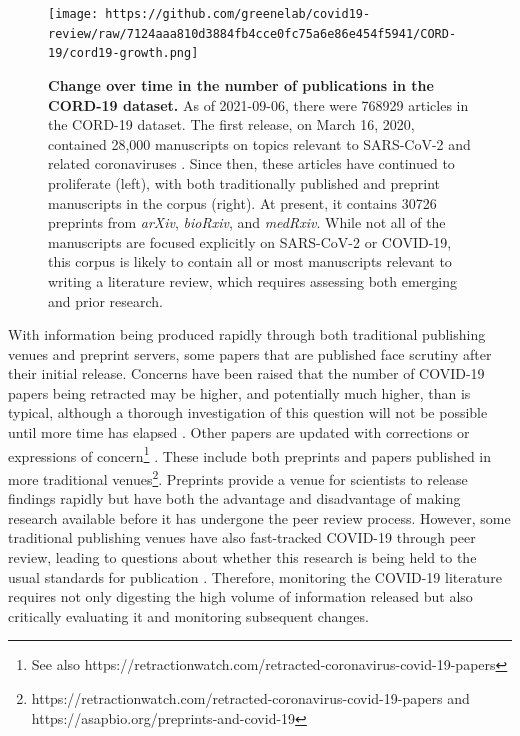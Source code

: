 \documentclass[twocolumn]{ceurart}
\begin{document}
\begin{figure}
\hypertarget{fig:cord19-growth}{%
\centering
\texttt{[image: https://github.com/greenelab/covid19-review/raw/7124aaa810d3884fb4cce0fc75a6e86e454f5941/CORD-19/cord19-growth.png]}
\caption{\textbf{Change over time in the number of publications in the CORD-19 dataset.}
As of 2021-09-06, there were 768929 articles in the CORD-19 dataset.
The first release, on March 16, 2020, contained 28,000 manuscripts on topics relevant to SARS-CoV-2 and related coronaviruses \citep{CiOwklc6}.
Since then, these articles have continued to proliferate (left), with both traditionally published and preprint manuscripts in the corpus (right).
At present, it contains 30726 preprints from \emph{arXiv}, \emph{bioRxiv}, and \emph{medRxiv}.
While not all of the manuscripts are focused explicitly on SARS-CoV-2 or COVID-19, this corpus is likely to contain all or most manuscripts relevant to writing a literature review, which requires assessing both emerging and prior research.}\label{fig:cord19-growth}
}
\end{figure}

With information being produced rapidly through both traditional publishing venues and preprint servers, some papers that are published face scrutiny after their initial release.
Concerns have been raised that the number of COVID-19 papers being retracted may be higher, and potentially much higher, than is typical, although a thorough investigation of this question will not be possible until more time has elapsed \citep{ZUk10707, caxpZEmy}.
Other papers are updated with corrections or expressions of concern\footnote{See also https://retractionwatch.com/retracted-coronavirus-covid-19-papers} \citep{caxpZEmy}.
These include both preprints and papers published in more traditional venues\footnote{https://retractionwatch.com/retracted-coronavirus-covid-19-papers and https://asapbio.org/preprints-and-covid-19}.
Preprints provide a venue for scientists to release findings rapidly but have both the advantage and disadvantage of making research available before it has undergone the peer review process.
However, some traditional publishing venues have also fast-tracked COVID-19 through peer review, leading to questions about whether this research is being held to the usual standards for publication \citep{1Dez1ZOc5}.
Therefore, monitoring the COVID-19 literature requires not only digesting the high volume of information released but also critically evaluating it and monitoring subsequent changes.
\end{document}
